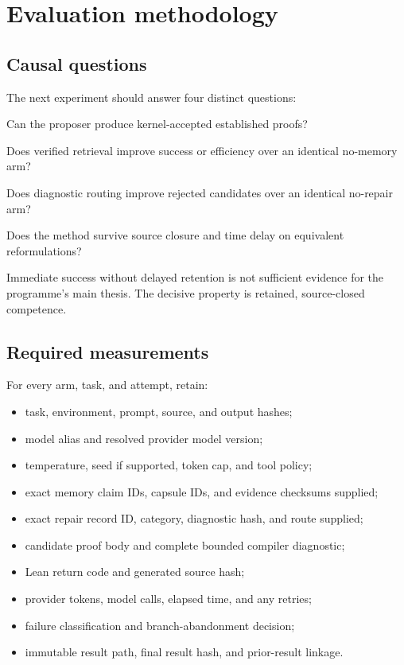 \documentclass[11pt,a4paper]{article}
\begin{document}
\section{Evaluation methodology}

\subsection{Causal questions}

The next experiment should answer four distinct questions:

\begin{description}[leftmargin=37mm,style=nextline]
  \item[Reconstruction] Can the proposer produce kernel-accepted established proofs?
  \item[Memory effect] Does verified retrieval improve success or efficiency over an identical no-memory arm?
  \item[Repair effect] Does diagnostic routing improve rejected candidates over an identical no-repair arm?
  \item[Retention effect] Does the method survive source closure and time delay on equivalent reformulations?
\end{description}

Immediate success without delayed retention is not sufficient evidence for the
programme's main thesis. The decisive property is retained, source-closed
competence.

\subsection{Required measurements}

For every arm, task, and attempt, retain:

\begin{itemize}
  \item task, environment, prompt, source, and output hashes;
  \item model alias and resolved provider model version;
  \item temperature, seed if supported, token cap, and tool policy;
  \item exact memory claim IDs, capsule IDs, and evidence checksums supplied;
  \item exact repair record ID, category, diagnostic hash, and route supplied;
  \item candidate proof body and complete bounded compiler diagnostic;
  \item Lean return code and generated source hash;
  \item provider tokens, model calls, elapsed time, and any retries;
  \item failure classification and branch-abandonment decision;
  \item immutable result path, final result hash, and prior-result linkage.
\end{itemize}
\end{document}
